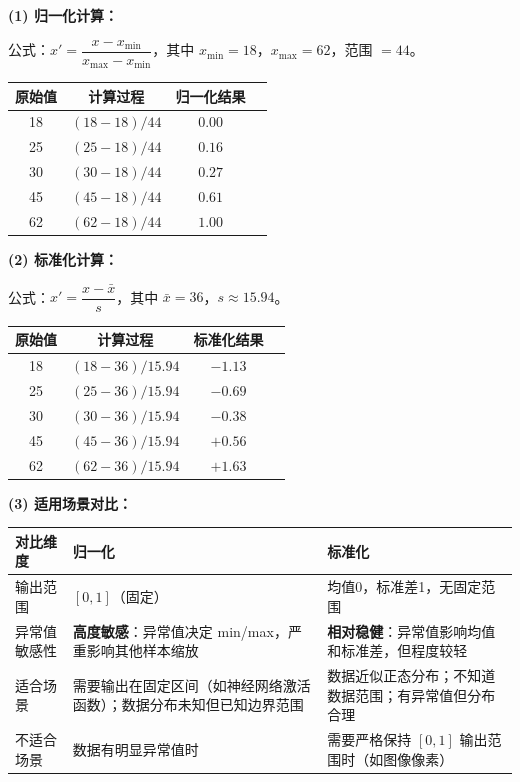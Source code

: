 \documentclass[a4paper,11pt]{ctexart}
\begin{document}
\begin{solutionbox}[参考答案与详细解析]
    \textbf{(1) 归一化计算：}

    公式：$x' = \dfrac{x - x_{\min}}{x_{\max} - x_{\min}}$，其中 $x_{\min}=18$，$x_{\max}=62$，范围 $=44$。

    \begin{center}
    \begin{tabular}{cccc}
        \toprule
        原始值 & 计算过程 & 归一化结果 \\
        \midrule
        18 & $(18-18)/44$ & $0.00$ \\
        25 & $(25-18)/44$ & $0.16$ \\
        30 & $(30-18)/44$ & $0.27$ \\
        45 & $(45-18)/44$ & $0.61$ \\
        62 & $(62-18)/44$ & $1.00$ \\
        \bottomrule
    \end{tabular}
    \end{center}

    \textbf{(2) 标准化计算：}

    公式：$x' = \dfrac{x - \bar{x}}{s}$，其中 $\bar{x}=36$，$s\approx15.94$。

    \begin{center}
    \begin{tabular}{cccc}
        \toprule
        原始值 & 计算过程 & 标准化结果 \\
        \midrule
        18 & $(18-36)/15.94$ & $-1.13$ \\
        25 & $(25-36)/15.94$ & $-0.69$ \\
        30 & $(30-36)/15.94$ & $-0.38$ \\
        45 & $(45-36)/15.94$ & $+0.56$ \\
        62 & $(62-36)/15.94$ & $+1.63$ \\
        \bottomrule
    \end{tabular}
    \end{center}

    \textbf{(3) 适用场景对比：}
    \begin{center}
    \begin{tabular}{p{2.5cm} p{4.5cm} p{4.5cm}}
        \toprule
        对比维度 & 归一化 & 标准化 \\
        \midrule
        输出范围 & $[0, 1]$（固定） & 均值0，标准差1，无固定范围 \\[0.8em]
        异常值敏感性 & \textbf{高度敏感}：异常值决定 min/max，严重影响其他样本缩放 & \textbf{相对稳健}：异常值影响均值和标准差，但程度较轻 \\[0.8em]
        适合场景 & 需要输出在固定区间（如神经网络激活函数）；数据分布未知但已知边界范围 & 数据近似正态分布；不知道数据范围；有异常值但分布合理 \\[0.8em]
        不适合场景 & 数据有明显异常值时 & 需要严格保持 $[0,1]$ 输出范围时（如图像像素） \\
        \bottomrule
    \end{tabular}
    \end{center}


\end{solutionbox}
\end{document}
